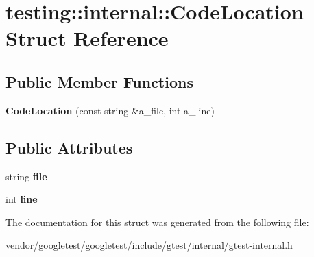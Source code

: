 \hypertarget{structtesting_1_1internal_1_1CodeLocation}{}\section{testing\+:\+:internal\+:\+:Code\+Location Struct Reference}
\label{structtesting_1_1internal_1_1CodeLocation}
\subsection*{Public Member Functions}
\begin{DoxyCompactItemize}
\item 
{\bfseries Code\+Location} (const string \&a\+\_\+file, int a\+\_\+line)\hypertarget{structtesting_1_1internal_1_1CodeLocation_ade3ecb2a54905619cd40a6856b48cd5a}{}\label{structtesting_1_1internal_1_1CodeLocation_ade3ecb2a54905619cd40a6856b48cd5a}

\end{DoxyCompactItemize}
\subsection*{Public Attributes}
\begin{DoxyCompactItemize}
\item 
string {\bfseries file}\hypertarget{structtesting_1_1internal_1_1CodeLocation_ab8a24d5e63295e411d37578dbb9427c0}{}\label{structtesting_1_1internal_1_1CodeLocation_ab8a24d5e63295e411d37578dbb9427c0}

\item 
int {\bfseries line}\hypertarget{structtesting_1_1internal_1_1CodeLocation_a01c977c7e8834a05a6d6c40b0c416045}{}\label{structtesting_1_1internal_1_1CodeLocation_a01c977c7e8834a05a6d6c40b0c416045}

\end{DoxyCompactItemize}


The documentation for this struct was generated from the following file\+:\begin{DoxyCompactItemize}
\item 
vendor/googletest/googletest/include/gtest/internal/gtest-\/internal.\+h\end{DoxyCompactItemize}
